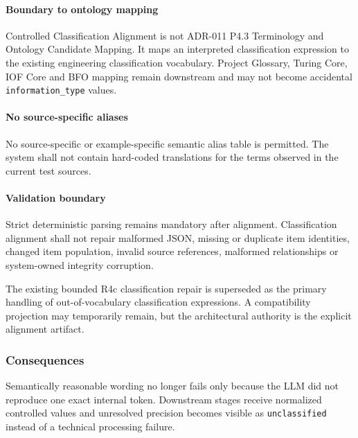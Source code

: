 \hypertarget{boundary-to-ontology-mapping}{%
\paragraph{Boundary to ontology mapping}\label{boundary-to-ontology-mapping}}

Controlled Classification Alignment is not ADR-011 P4.3 Terminology and Ontology Candidate Mapping. It maps an interpreted classification expression to the existing engineering classification vocabulary. Project Glossary, Turing Core, IOF Core and BFO mapping remain downstream and may not become accidental \texttt{information\_type} values.

\hypertarget{no-source-specific-aliases}{%
\paragraph{No source-specific aliases}\label{no-source-specific-aliases}}

No source-specific or example-specific semantic alias table is permitted. The system shall not contain hard-coded translations for the terms observed in the current test sources.

\hypertarget{validation-boundary}{%
\paragraph{Validation boundary}\label{validation-boundary}}

Strict deterministic parsing remains mandatory after alignment. Classification alignment shall not repair malformed JSON, missing or duplicate item identities, changed item population, invalid source references, malformed relationships or system-owned integrity corruption.

The existing bounded R4c classification repair is superseded as the primary handling of out-of-vocabulary classification expressions. A compatibility projection may temporarily remain, but the architectural authority is the explicit alignment artifact.

\hypertarget{consequences-14}{%
\subsubsection{Consequences}\label{consequences-14}}

Semantically reasonable wording no longer fails only because the LLM did not reproduce one exact internal token. Downstream stages receive normalized controlled values and unresolved precision becomes visible as \texttt{unclassified} instead of a technical processing failure.

